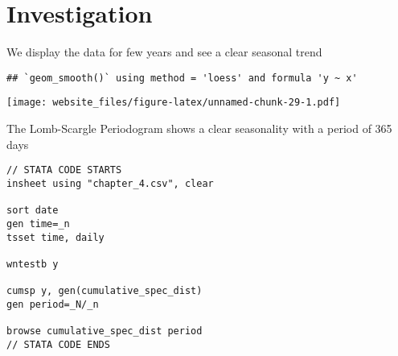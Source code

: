 \documentclass[]{book}
\newenvironment{Shaded}{\begin{snugshade}}{\end{snugshade}}
\newcommand{\KeywordTok}[1]{\textcolor[rgb]{0.13,0.29,0.53}{\textbf{#1}}}
\newcommand{\DataTypeTok}[1]{\textcolor[rgb]{0.13,0.29,0.53}{#1}}
\newcommand{\DecValTok}[1]{\textcolor[rgb]{0.00,0.00,0.81}{#1}}
\newcommand{\StringTok}[1]{\textcolor[rgb]{0.31,0.60,0.02}{#1}}
\newcommand{\CommentTok}[1]{\textcolor[rgb]{0.56,0.35,0.01}{\textit{#1}}}
\newcommand{\OperatorTok}[1]{\textcolor[rgb]{0.81,0.36,0.00}{\textbf{#1}}}
\newcommand{\NormalTok}[1]{#1}
\begin{document}
\newpage

\section{Investigation}\label{investigation-1}

We display the data for few years and see a clear seasonal trend

\begin{Shaded}
\end{Shaded}

\begin{verbatim}
## `geom_smooth()` using method = 'loess' and formula 'y ~ x'
\end{verbatim}

\texttt{[image: website\_files/figure-latex/unnamed-chunk-29-1.pdf]}

\newpage

The Lomb-Scargle Periodogram shows a clear seasonality with a period of
365 days

\begin{verbatim}
// STATA CODE STARTS
insheet using "chapter_4.csv", clear

sort date
gen time=_n
tsset time, daily

wntestb y

cumsp y, gen(cumulative_spec_dist)
gen period=_N/_n

browse cumulative_spec_dist period
// STATA CODE ENDS
\end{verbatim}

\begin{Shaded}
\end{Shaded}
\end{document}
